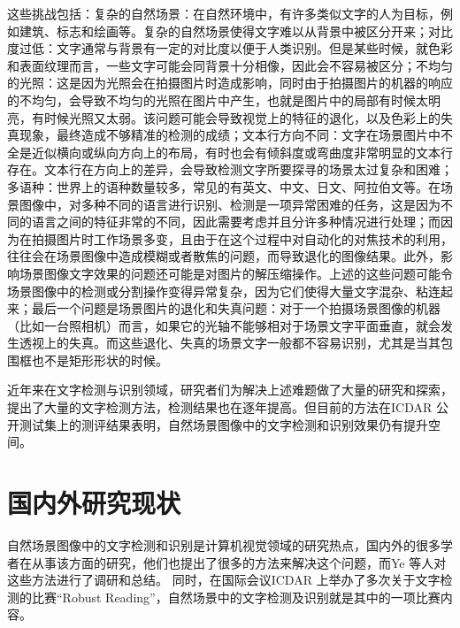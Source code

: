     这些挑战包括：复杂的自然场景：在自然环境中，有许多类似文字的人为目标，例如建筑、标志和绘画等。复杂的自然场景使得文字难以从背景中被区分开来；对比度过低：文字通常与背景有一定的对比度以便于人类识别。但是某些时候，就色彩和表面纹理而言，一些文字可能会同背景十分相像，因此会不容易被区分；不均匀的光照：这是因为光照会在拍摄图片时造成影响，同时由于拍摄图片的机器的响应的不均匀，会导致不均匀的光照在图片中产生，也就是图片中的局部有时候太明亮，有时候光照又太弱。该问题可能会导致视觉上的特征的退化，以及色彩上的失真现象，最终造成不够精准的检测的成绩；文本行方向不同：文字在场景图片中不全是近似横向或纵向方向上的布局，有时也会有倾斜度或弯曲度非常明显的文本行存在。文本行在方向上的差异，会导致检测文字所要探寻的场景太过复杂和困难；多语种：世界上的语种数量较多，常见的有英文、中文、日文、阿拉伯文等。在场景图像中，对多种不同的语言进行识别、检测是一项异常困难的任务，这是因为不同的语言之间的特征非常的不同，因此需要考虑并且分许多种情况进行处理；而因为在拍摄图片时工作场景多变，且由于在这个过程中对自动化的对焦技术的利用，往往会在场景图像中造成模糊或者散焦的问题，而导致退化的图像结果。此外，影响场景图像文字效果的问题还可能是对图片的解压缩操作。上述的这些问题可能令场景图像中的检测或分割操作变得异常复杂，因为它们使得大量文字混杂、粘连起来；最后一个问题是场景图片的退化和失真问题：对于一个拍摄场景图像的机器（比如一台照相机）而言，如果它的光轴不能够相对于场景文字平面垂直，就会发生透视上的失真。而这些退化、失真的场景文字一般都不容易识别，尤其是当其包围框也不是矩形形状的时候。

    近年来在文字检测与识别领域，研究者们为解决上述难题做了大量的研究和探索，提出了大量的文字检测方法，检测结果也在逐年提高。但目前的方法在ICDAR 公开测试集上的测评结果表明，自然场景图像中的文字检测和识别效果仍有提升空间。

    \section{国内外研究现状}

    自然场景图像中的文字检测和识别是计算机视觉领域的研究热点，国内外的很多学者在从事该方面的研究，他们也提出了很多的方法来解决这个问题，而Ye 等人\cite{Ye2015Text}对这些方法进行了调研和总结。 同时，在国际会议ICDAR 上举办了多次关于文字检测的比赛“Robust Reading”\cite{Karatzas2013ICDAR}，自然场景中的文字检测及识别就是其中的一项比赛内容。

